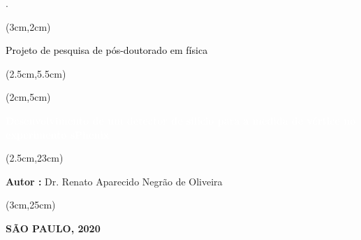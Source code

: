 \begin{titlepage}.
    

    \vspace{3.5cm}

    
    \begin{textblock*}{15cm}(3cm,2cm)
        \begin{Huge}
            \begin{center}
                \makeatletter
                \noindent\textcolor{black}{ Projeto de pesquisa de pós-doutorado em física}
                \makeatother
            \end{center}
        \end{Huge}
    \end{textblock*}
    
    \begin{textblock*}{15cm}(2.5cm,5.5cm)
        \makeatletter
        \begin{LARGE}
            \begin{center}
                \color{black}
                {\it  }
            \end{center}
         \end{LARGE}
     
    \end{textblock*}
    
    \begin{textblock*}{17.5cm}(2cm,5cm)
        \begin{Huge}
            \begin{center}
                \makeatletter
                \noindent\textcolor{white}{\textbf{Desenvolvimento de um detector de silício para a medida de vértice no experimento sPhenix}}
                \makeatother
            \end{center}
        \end{Huge}
    \end{textblock*}

    \begin{textblock*}{15cm}(2.5cm,23cm)
        \begin{LARGE}
        \begin{center}
            \color{white}
                \textbf{Autor :} Dr. Renato Aparecido Negrão de Oliveira 
        \end{center}
            
        \end{LARGE}
        
    \end{textblock*}
    
    \begin{textblock*}{15cm}(3cm,25cm)
        \makeatletter
        \begin{center}
            {\color{white}
                \textbf{SÃO PAULO, 2020} 
            }
        \end{center}
        \makeatother
    \end{textblock*}

\end{titlepage}

